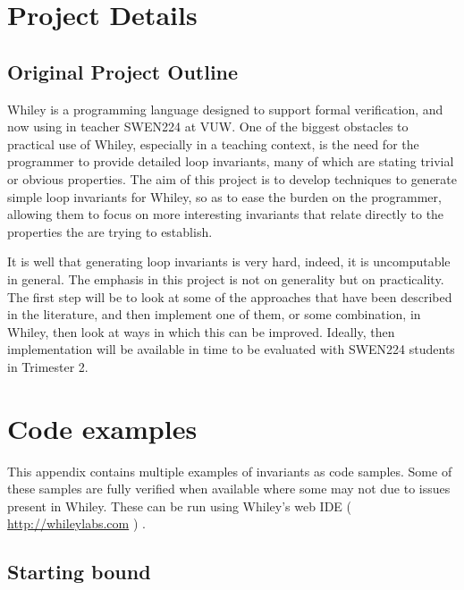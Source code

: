 \begin{appendices}

\chapter{Project Details}\label{A:proj-details}

\section{Original Project Outline}\label{A:proj-outline}

Whiley is a programming language designed to support formal verification, and now using in teacher SWEN224 at VUW.
One of the biggest obstacles to practical use of Whiley,
especially in a teaching context, is the need for  the programmer to provide detailed loop invariants,
many of which are stating trivial or obvious properties.
The aim of this project is to develop techniques to generate simple loop invariants for Whiley,
so as to ease the burden on the programmer,
allowing them to focus on more interesting invariants that relate directly to
the properties the are trying to establish.

It is well that generating loop invariants is very hard, indeed, it is uncomputable in general.
The emphasis in this project is not on generality but on practicality.
The first step will be to look at some of the approaches that have been described in the literature,
and then implement one of them, or some combination, in Whiley, then look at ways in which this can be improved.
Ideally, then implementation will be available in time to be evaluated with SWEN224 students in Trimester 2.

\chapter{Code examples}\label{A:code-examples}


This appendix contains multiple examples of invariants as code samples.
Some of these samples are fully verified when available where some may
not due to issues present in Whiley. 
These can be run using Whiley's web IDE ( \url{http://whileylabs.com} ) .

\section{Starting bound}


\end{appendices}

